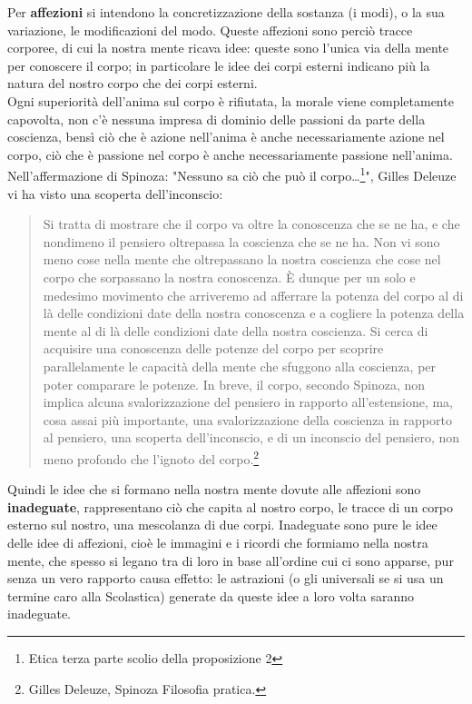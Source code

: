Per \textbf{affezioni} si intendono la concretizzazione della sostanza (i modi), o la sua variazione, le modificazioni del modo. Queste affezioni sono perciò tracce corporee, di cui la nostra mente ricava idee: queste sono l'unica via della mente per conoscere il corpo; in particolare le idee dei corpi esterni indicano più la natura del nostro corpo che dei corpi esterni.\\
Ogni superiorità dell'anima sul corpo è rifiutata, la morale viene completamente capovolta, non c'è nessuna impresa di dominio delle passioni da parte della coscienza, bensì ciò che è azione nell’anima è anche necessariamente azione nel corpo, ciò che è passione nel corpo è anche necessariamente passione nell’anima. Nell'affermazione di Spinoza: "Nessuno sa ciò che può il corpo…\footnote{Etica terza parte scolio della proposizione 2}", Gilles Deleuze vi ha visto una scoperta dell'inconscio:

\begin{quotation}
	\small Si tratta di mostrare che il corpo va oltre la conoscenza che se ne ha, e che nondimeno il pensiero oltrepassa la coscienza che se ne ha. Non vi sono meno cose nella mente che oltrepassano la nostra coscienza che cose nel corpo che sorpassano la nostra conoscenza. È dunque per un solo e medesimo movimento che arriveremo ad afferrare la potenza del corpo al di là delle condizioni date della nostra conoscenza e a cogliere la potenza della mente al di là delle condizioni date della nostra coscienza. Si cerca di acquisire una conoscenza delle potenze del corpo per scoprire parallelamente le capacità della mente che sfuggono alla coscienza, per poter comparare le potenze. In breve, il corpo, secondo Spinoza, non implica alcuna svalorizzazione del pensiero in rapporto all’estensione, ma, cosa assai più importante, una svalorizzazione della coscienza in rapporto al pensiero, una scoperta dell’inconscio, e di un inconscio del pensiero, non meno profondo che l’ignoto del corpo.\footnote{Gilles Deleuze, Spinoza Filosofia pratica.}
\end{quotation}

Quindi le idee che si formano nella nostra mente dovute alle affezioni sono \textbf{inadeguate}, rappresentano ciò che capita al nostro corpo, le tracce di un corpo esterno sul nostro, una mescolanza di due corpi. Inadeguate sono pure le idee delle idee di affezioni, cioè le immagini e i ricordi che formiamo nella nostra mente, che spesso si legano tra di loro in base all'ordine cui ci sono apparse, pur senza un vero rapporto causa effetto: le astrazioni (o gli universali se si usa un termine caro alla Scolastica) generate da queste idee a loro volta saranno inadeguate.

